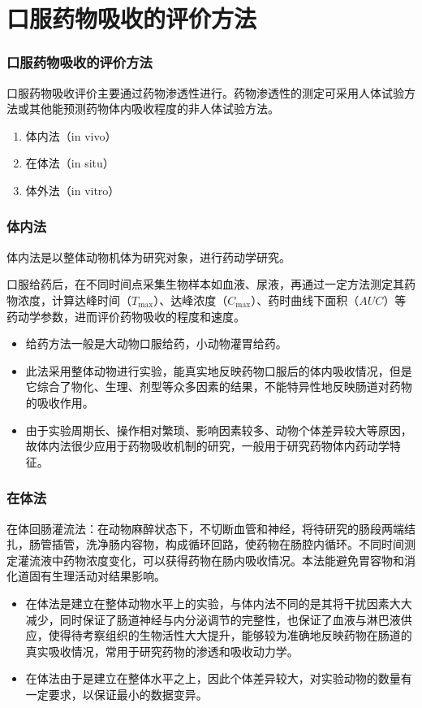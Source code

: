 \section{口服药物吸收的评价方法}

\begin{frame}
    \frametitle{口服药物吸收的评价方法}
    口服药物吸收评价主要通过药物渗透性进行。药物渗透性的测定可采用人体试验方法或其他能预测药物体内吸收程度的非人体试验方法。
    \begin{enumerate}
      \item 体内法（in vivo）
      \item 在体法（in situ）
      \item 体外法（in vitro）
    \end{enumerate}
\end{frame}


\begin{frame}
    \frametitle{体内法}
    体内法是以整体动物机体为研究对象，进行药动学研究。

    口服给药后，在不同时间点采集生物样本如血液、尿液，再通过一定方法测定其药物浓度，计算达峰时间（$T _\mathrm{max}$）、达峰浓度（$C_\mathrm{max}$）、药时曲线下面积（$AUC$）等药动学参数，进而评价药物吸收的程度和速度。

    \begin{itemize}
      \item 给药方法一般是大动物口服给药，小动物灌胃给药。
      \item 此法采用整体动物进行实验，能真实地反映药物口服后的体内吸收情况，但是它综合了物化、生理、剂型等众多因素的结果，不能特异性地反映肠道对药物的吸收作用。
      \item 由于实验周期长、操作相对繁琐、影响因素较多、动物个体差异较大等原因，故体内法很少应用于药物吸收机制的研究，一般用于研究药物体内药动学特征。
    \end{itemize}

\end{frame}


\begin{frame}
    \frametitle{在体法}      
    在体回肠灌流法：在动物麻醉状态下，不切断血管和神经，将待研究的肠段两端结扎，肠管插管，洗净肠内容物，构成循环回路，使药物在肠腔内循环。不同时间测定灌流液中药物浓度变化，可以获得药物在肠内吸收情况。本法能避免胃容物和消化道固有生理活动对结果影响。
      \begin{itemize}
        \item 在体法是建立在整体动物水平上的实验，与体内法不同的是其将干扰因素大大减少，同时保证了肠道神经与内分泌调节的完整性，也保证了血液与淋巴液供应，使得待考察组织的生物活性大大提升，能够较为准确地反映药物在肠道的真实吸收情况，常用于研究药物的渗透和吸收动力学。
        \item 在体法由于是建立在整体水平之上，因此个体差异较大，对实验动物的数量有一定要求，以保证最小的数据变异。
      \end{itemize}

\end{frame}


